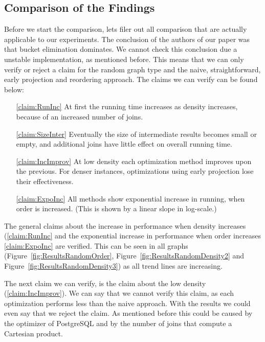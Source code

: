 \subsection{Comparison of the Findings} \label{subsec:DissComparison}
Before we start the comparison, lets filer out all comparison that are actually applicable to our experiments. The conclusion of the authors of our paper \cite{paper} was that bucket elimination dominates. We cannot check this conclusion due a unstable implementation, as mentioned before. This means that we can only verify or reject a claim for the random graph type and the naive, straightforward, early projection and reordering approach. The claims we can verify can be found below: 

\begin{enumerate}
\item[\ref{claim:RunInc}] At first the running time increases as density increases, because of an increased number of joins.
\item[\ref{claim:SizeInter}] Eventually the size of intermediate results becomes small or empty, and additional joins have little effect on overall running time.
\item[\ref{claim:IncImprov}] At low density each optimization method improves upon the previous. For denser instances, optimizations using early projection lose their effectiveness.
\item[\ref{claim:ExpoInc}] All methods show exponential increase in running, when order is increased. (This is shown by a linear slope in log-scale.)
\end{enumerate}

The general claims about the increase in performance when density increases (\ref{claim:RunInc} and the exponential increase in performance when order increases \ref{claim:ExpoInc} are verified. This can be seen in all graphs (Figure~\ref{fig:ResultsRandomOrder}, Figure~\ref{fig:ResultsRandomDensity2} and Figure~\ref{fig:ResultsRandomDensity3}) as all trend lines are increasing. 

The next claim we can verify, is the claim about the low density (\ref{claim:IncImprov}). We can say that we cannot verify this claim, as each optimization performs less than the naive approach. With the results we could even say that we reject the claim. As mentioned before this could be caused by the optimizer of PostgreSQL and by the number of joins that compute a Cartesian product.

